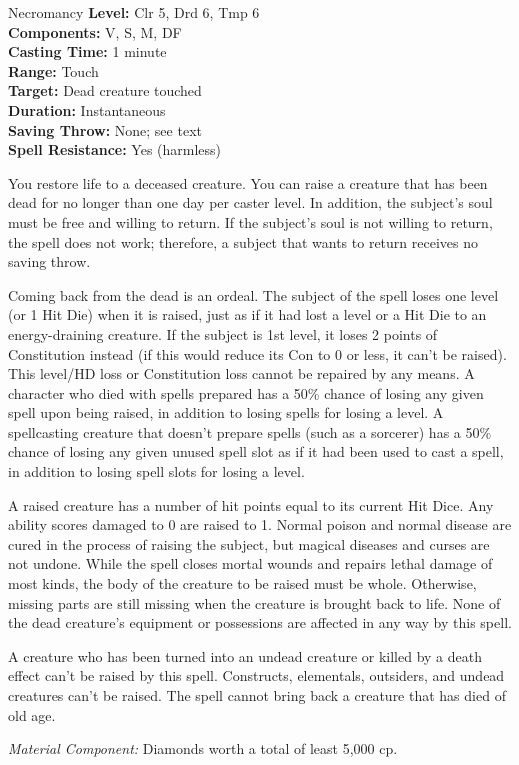 {Necromancy}
{
	\textbf{Level:}
	Clr 5, Drd 6, Tmp 6\\
	\textbf{Components:}
	V, S, M, DF\\
	\textbf{Casting Time:}
	1 minute\\
	\textbf{Range:}
	Touch\\
	\textbf{Target:}
	Dead creature touched\\
	\textbf{Duration:}
	Instantaneous\\
	\textbf{Saving Throw:}
	None; see text\\
	\textbf{Spell Resistance:}
	Yes (harmless)\\
}
{
	You restore life to a deceased creature. You can raise a creature that has been dead for no longer than one day per caster level. In addition, the subject's soul must be free and willing to return. If the subject's soul is not willing to return, the spell does not work; therefore, a subject that wants to return receives no saving throw.

	Coming back from the dead is an ordeal. The subject of the spell loses one level (or 1 Hit Die) when it is raised, just as if it had lost a level or a Hit Die to an energy-draining creature. If the subject is 1st level, it loses 2 points of Constitution instead (if this would reduce its Con to 0 or less, it can't be raised). This level/HD loss or Constitution loss cannot be repaired by any means. A character who died with spells prepared has a 50\% chance of losing any given spell upon being raised, in addition to losing spells for losing a level. A spellcasting creature that doesn't prepare spells (such as a sorcerer) has a 50\% chance of losing any given unused spell slot as if it had been used to cast a spell, in addition to losing spell slots for losing a level.

	A raised creature has a number of hit points equal to its current Hit Dice. Any ability scores damaged to 0 are raised to 1. Normal poison and normal disease are cured in the process of raising the subject, but magical diseases and curses are not undone. While the spell closes mortal wounds and repairs lethal damage of most kinds, the body of the creature to be raised must be whole. Otherwise, missing parts are still missing when the creature is brought back to life. None of the dead creature's equipment or possessions are affected in any way by this spell.

	A creature who has been turned into an undead creature or killed by a death effect can't be raised by this spell. Constructs, elementals, outsiders, and undead creatures can't be raised. The spell cannot bring back a creature that has died of old age.

	\textit{Material Component:}
	Diamonds worth a total of least 5,000 cp.

}
